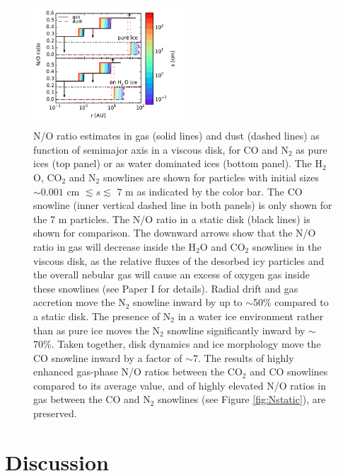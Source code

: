 \documentclass[apj]{emulateapj}
\begin{document}
\begin{figure}[h!]
\centering
\includegraphics[width=0.5\textwidth]{N_O_water_ice.pdf}
\caption{N/O ratio estimates in gas (solid lines) and dust (dashed lines) as function of semimajor axis in a viscous disk, for CO and N$_2$ as pure ices (top panel) or as water dominated ices (bottom panel). The H$_2$O, CO$_2$ and N$_2$ snowlines are shown for particles with initial sizes $\sim0.001$ cm $\lesssim s \lesssim$ 7 m as indicated by the color bar. The CO snowline (inner vertical dashed line in both panels) is only shown for the 7 m particles. The N/O ratio in a static disk (black lines) is shown for comparison. The downward arrows show that the N/O ratio in gas will decrease inside the H$_2$O and CO$_2$ snowlines in the viscous disk, as the relative fluxes of the desorbed icy
particles and the overall nebular gas will cause an excess of oxygen gas inside these snowlines (see Paper I for details). Radial drift and gas accretion move the N$_2$ snowline inward by up to $\sim$50\% compared to a static disk. The presence of N$_2$ in a water ice environment rather than as pure ice moves the N$_2$ snowline significantly inward by $\sim$70\%. Taken together, disk dynamics and ice morphology move the CO snowline inward by a factor of $\sim$7. The results of highly enhanced gas-phase N/O ratios between the CO$_2$ and CO snowlines compared to its average value, and of highly elevated N/O ratios in gas between the CO and N$_2$ snowlines (see Figure \ref{fig:Nstatic}), are preserved.}  
\label{fig:NO_ratio}
\end{figure}





\section{Discussion}
\label{sec:discussion}
\end{document}
